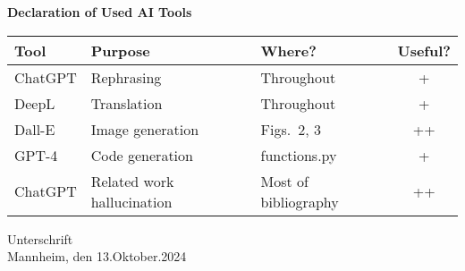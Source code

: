 \documentclass[a4paper,oneside,bibliography=totoc]{scrbook}
\begin{document}
\begin{center}
    \textbf{Declaration of Used AI Tools} \\[.3em]
    \begin{tabularx}{\textwidth}{lXlc}
        \toprule
        Tool        & Purpose                       & Where?                        & Useful? \\
        \midrule
        ChatGPT     & Rephrasing                    & Throughout                    & +       \\
        DeepL       & Translation                   & Throughout                    & +       \\
        Dall-E      & Image generation              & Figs.~2, 3                    & ++      \\
        GPT-4       & Code generation               & functions.py                  & +       \\
        ChatGPT     & Related work hallucination    & Most of bibliography          & ++      \\
        \bottomrule
    \end{tabularx}
\end{center}
\vspace{2cm}
\noindent Unterschrift\\
\noindent Mannheim, den 13.Oktober.2024 \hfill
\end{document}
